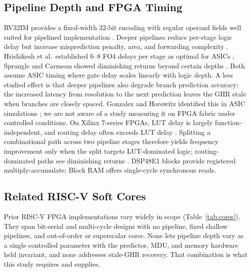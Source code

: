 \documentclass[acmsmall,nonacm,screen]{acmart}
\begin{document}
\subsection{Pipeline Depth and FPGA Timing}

RV32IM provides a fixed-width 32-bit encoding with regular operand fields well suited for pipelined implementation \cite{waterman2019riscv, patterson2020computer}.
Deeper pipelines reduce per-stage logic delay but increase misprediction penalty, area, and forwarding complexity \cite{hennessy2017computer, hrishikesh2002optimal}.
Hrishikesh et al.\ established 6--8 FO4 delays per stage as optimal for ASICs \cite{hrishikesh2002optimal}; Sprangle and Carmean showed diminishing returns beyond certain depths \cite{sprangle2002increasing}.
Both assume ASIC timing where gate delay scales linearly with logic depth.
A less studied effect is that deeper pipelines also degrade branch prediction accuracy: the increased latency from resolution to the next prediction leaves the GHR stale when branches are closely spaced.
Gonzalez and Horowitz identified this in ASIC simulations \cite{gonzalez1999power}; we are not aware of a study measuring it on FPGA fabric under controlled conditions.
On Xilinx 7-series FPGAs, LUT delay is largely function-independent, and routing delay often exceeds LUT delay \cite{xilinx_7series, kuon2007measuring}.
Splitting a combinational path across two pipeline stages therefore yields frequency improvement only when the split targets LUT-dominated logic; routing-dominated paths see diminishing returns \cite{kuon2007measuring}.
DSP48E1 blocks provide registered multiply-accumulate; Block RAM offers single-cycle synchronous reads.

\subsection{Related RISC-V Soft Cores}

Prior RISC-V FPGA implementations vary widely in scope (Table~\ref{tab:cores}). They span bit-serial and multi-cycle designs with no pipeline, fixed shallow pipelines, and out-of-order or superscalar cores. None lets pipeline depth vary as a single controlled parameter with the predictor, MDU, and memory hardware held invariant, and none addresses stale-GHR recovery. That combination is what this study requires and supplies.
\end{document}
